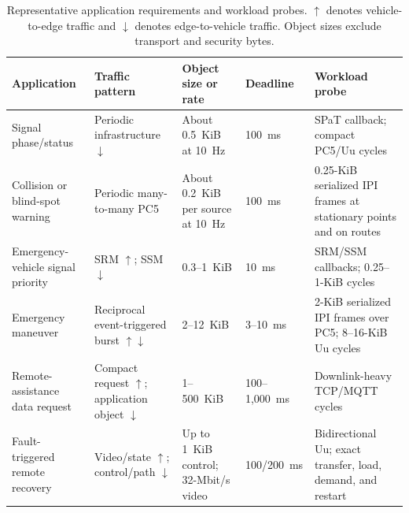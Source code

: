 \begin{table}[t]
  \caption{Representative application requirements and workload probes.
  $\uparrow$ denotes vehicle-to-edge traffic and $\downarrow$ denotes
  edge-to-vehicle traffic. Object sizes exclude transport and security bytes.}
  \label{tab:application-envelopes}
  \centering
  \footnotesize
  \setlength{\tabcolsep}{2.5pt}
  \renewcommand{\arraystretch}{1.15}
  \begin{tabular}{@{}C{0.17\textwidth}C{0.20\textwidth}C{0.18\textwidth}C{0.11\textwidth}C{0.24\textwidth}@{}}
    \toprule
    Application & Traffic pattern & Object size or rate & Deadline & Workload probe \\
    \midrule
    Signal phase/status & Periodic infrastructure $\downarrow$ & About 0.5~KiB at 10~Hz & 100~ms & SPaT callback; compact PC5/Uu cycles \\
    Collision or blind-spot warning & Periodic many-to-many PC5 & About 0.2~KiB per source at 10~Hz & 100~ms & 0.25-KiB serialized IPI frames at stationary points and on routes \\
    Emergency-vehicle signal priority & SRM $\uparrow$; SSM $\downarrow$ & 0.3--1~KiB & 10~ms & SRM/SSM callbacks; 0.25--1-KiB cycles \\
    Emergency maneuver & Reciprocal event-triggered burst $\uparrow\downarrow$ & 2--12~KiB & 3--10~ms & 2-KiB serialized IPI frames over PC5; 8--16-KiB Uu cycles \\
    Remote-assistance data request & Compact request $\uparrow$; application object $\downarrow$ & 1--500~KiB & 100--1,000~ms & Downlink-heavy TCP/MQTT cycles \\
    Fault-triggered remote recovery & Video/state $\uparrow$; control/path $\downarrow$ & Up to 1~KiB control; 32-Mbit/s video & 100/200~ms & Bidirectional Uu; exact transfer, load, demand, and restart \\
    \bottomrule
  \end{tabular}
\end{table}

